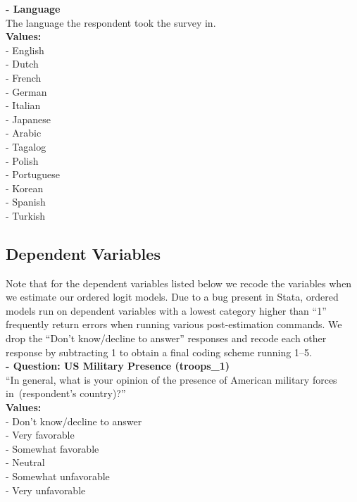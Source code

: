 \documentclass[12pt]{article}
\begin{document}
\noindent\textbf{  - Language} \\
The language the respondent took the survey in.\\
\textbf{Values:}\\
 - English\\
 - Dutch\\
 - French\\
 - German\\
 - Italian\\
 - Japanese\\
 - Arabic \\
 - Tagalog\\
 - Polish\\
 - Portuguese\\ 
 - Korean \\
 - Spanish \\
 - Turkish\\


\subsection{Dependent Variables}

Note that for the dependent variables listed below we recode the variables when we estimate our ordered logit models. Due to a bug present in Stata, ordered models run on dependent variables with a lowest category higher than ``1'' frequently return errors when running various post-estimation commands. We drop the ``Don't know/decline to answer'' responses and recode each other response by subtracting 1 to obtain a final coding scheme running 1--5. \\


\noindent\textbf{  - Question: US Military Presence (troops\_1)} \\
``In general, what is your opinion of the presence of American military forces in (respondent's country)?''\\
\textbf{Values:}\\
 - Don’t know/decline to answer\\
 - Very favorable \\
 - Somewhat favorable\\
 - Neutral\\
 - Somewhat unfavorable\\
 - Very unfavorable\\
\end{document}
